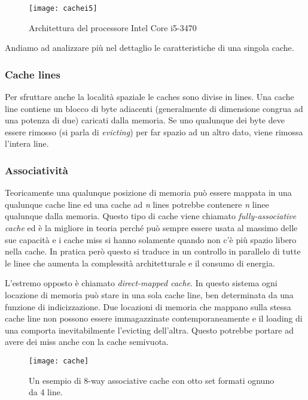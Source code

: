 			\begin{figure}
				\begin{center}
					\texttt{[image: cachei5]}
					\caption{Architettura del processore Intel Core i5-3470}
					\label{fig:cachei5}
				\end{center}
			\end{figure}
			
			Andiamo ad analizzare più nel dettaglio le caratteristiche di una singola cache\cite{ge2016survey,yarom2014flush+}.
			
			\subsubsection{Cache lines}
				Per sfruttare anche la località spaziale le caches sono divise in lines. Una cache line contiene un blocco di byte adiacenti (generalmente di dimensione congrua ad una potenza di due) caricati dalla memoria. Se uno qualunque dei byte deve essere rimosso (si parla di \emph{evicting}) per far spazio ad un altro dato, viene rimossa l'intera line.
				
			\subsubsection{Associatività}
				Teoricamente una qualunque posizione di memoria può essere mappata in una qualunque cache line ed una cache ad \emph{n} lines potrebbe contenere \emph{n} linee qualunque dalla memoria. Questo tipo di cache viene chiamato \emph{fully-associative cache} ed è la migliore in teoria perché può sempre essere usata al massimo delle sue capacità e i cache miss si hanno solamente quando non c'è più spazio libero nella cache. In pratica però questo si traduce in un controllo in parallelo di tutte le linee che aumenta la complessità architetturale e il consumo di energia.
				
				L'estremo opposto è chiamato \emph{direct-mapped cache}. In questo sistema ogni locazione di memoria può stare in una sola cache line, ben determinata da una funzione di indicizzazione. Due locazioni di memoria che mappano sulla stessa cache line non possono essere immagazzinate contemporaneamente e il loading di una comporta inevitabilmente l'evicting dell'altra. Questo potrebbe portare ad avere dei miss anche con la cache semivuota.
				
				\begin{figure}
					\begin{center}
						\texttt{[image: cache]}
						\caption{Un esempio di 8-way associative cache con otto set formati ognuno da 4 line.}
						\label{fig:cache}
					\end{center}
				\end{figure}
				
